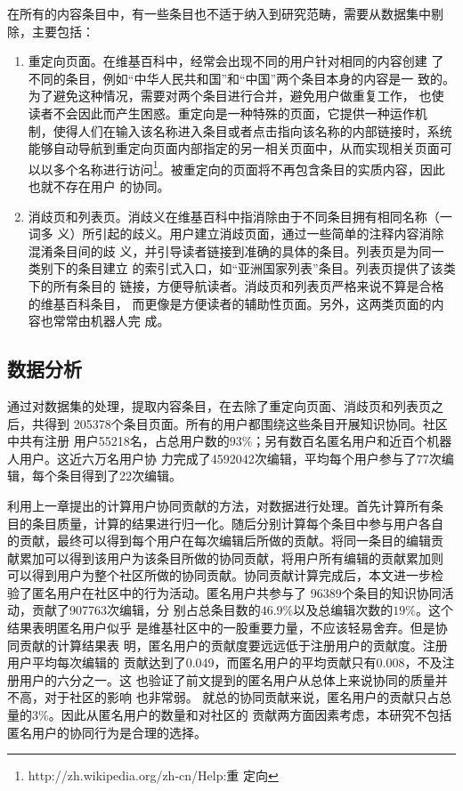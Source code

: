 在所有的内容条目中，有一些条目也不适于纳入到研究范畴，需要从数据集中剔
除，主要包括：
\begin{enumerate}
\item 重定向页面。在维基百科中，经常会出现不同的用户针对相同的内容创建
  了不同的条目，例如“中华人民共和国”和“中国”两个条目本身的内容是一
  致的。为了避免这种情况，需要对两个条目进行合并，避免用户做重复工作，
  也使读者不会因此而产生困惑。重定向是一种特殊的页面，它提供一种运作机
  制，使得人们在输入该名称进入条目或者点击指向该名称的内部链接时，系统
  能够自动导航到重定向页面内部指定的另一相关页面中，从而实现相关页面可
  以以多个名称进行访问\footnote{http://zh.wikipedia.org/zh-cn/Help:重
    定向}。被重定向的页面将不再包含条目的实质内容，因此也就不存在用户
  的协同。
\item 消歧页和列表页。消歧义在维基百科中指消除由于不同条目拥有相同名称（一词多
  义）所引起的歧义。用户建立消歧页面，通过一些简单的注释内容消除混淆条目间的歧
  义，并引导读者链接到准确的具体的条目。列表页是为同一类别下的条目建立
  的索引式入口，如“亚洲国家列表”条目。列表页提供了该类下的所有条目的
  链接，方便导航读者。消歧页和列表页严格来说不算是合格的维基百科条目，
  而更像是方便读者的辅助性页面。另外，这两类页面的内容也常常由机器人完
  成。 
\end{enumerate}

\subsection{数据分析}
\label{sec:data-analysis}
通过对数据集的处理，提取内容条目，在去除了重定向页面、消歧页和列表页之后，共得到
205378个条目页面。所有的用户都围绕这些条目开展知识协同。社区中共有注册
用户55218名，占总用户数的$93\%$；另有数百名匿名用户和近百个机器人用户。这近六万名用户协
力完成了4592042次编辑，平均每个用户参与了77次编辑，每个条目得到了22次编辑。

利用上一章提出的计算用户协同贡献的方法，对数据进行处理。首先计算所有条
目的条目质量，计算的结果进行归一化。随后分别计算每个条目中参与用户各自
的贡献，最终可以得到每个用户在每次编辑后所做的贡献。将同一条目的编辑贡
献累加可以得到该用户为该条目所做的协同贡献，将用户所有编辑的贡献累加则
可以得到用户为整个社区所做的协同贡献。协同贡献计算完成后，本文进一步检
验了匿名用户在社区中的行为活动。匿名用户共参与了 96389个条目的知识协同活动，贡献了907763次编辑，分
别占总条目数的$46.9\%$以及总编辑次数的$19\%$。这个结果表明匿名用户似乎
是维基社区中的一股重要力量，不应该轻易舍弃。但是协同贡献的计算结果表
明，匿名用户的贡献度要远远低于注册用户的贡献度。注册用户平均每次编辑的
贡献达到了0.049，而匿名用户的平均贡献只有0.008，不及注册用户的六分之一。这
也验证了前文提到的匿名用户从总体上来说协同的质量并不高，对于社区的影响
也非常弱。
就总的协同贡献来说，匿名用户的贡献只占总量的$3\%$。因此从匿名用户的数量和对社区的
贡献两方面因素考虑，本研究不包括匿名用户的协同行为是合理的选择。

